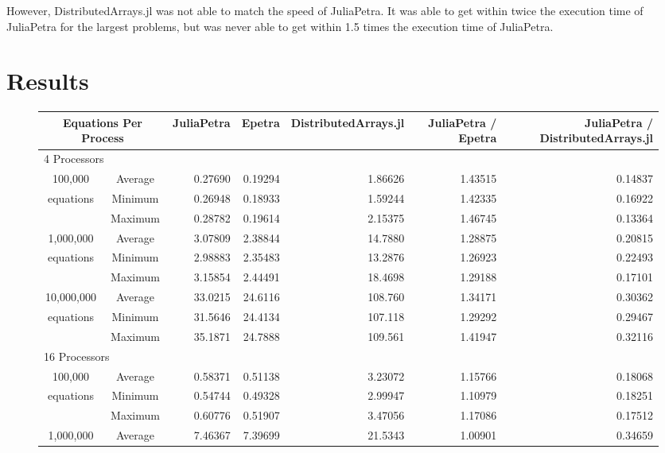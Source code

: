 \documentclass[acmsmall]{acmart}
\begin{document}
However, DistributedArrays.jl was not able to match the speed of JuliaPetra.
It was able to get within twice the execution time of JuliaPetra for the largest problems,
but was never able to get within 1.5 times the execution time of JuliaPetra.

\section{Results}

\begin{figure}
\begin{tabular}{|c c|r|r|r||r|r|}
	\hline
		\multicolumn{2}{|c|}{Equations Per Process}
		& JuliaPetra
		& Epetra
		& \multicolumn{1}{m{1.8cm}||}{Distributed\-Arrays.jl}
		& \multicolumn{1}{m{1.75cm}|}{JuliaPetra / Epetra}
		& \multicolumn{1}{m{1.8cm}|}{JuliaPetra / Distributed\-Arrays.jl} \\
	\hline
		\multicolumn{7}{|l|}{4 Processors}\\
	\hline
		100,000			&Average & 0.27690 & 0.19294 & 1.86626 & 1.43515 & 0.14837 \\
		equations		&Minimum & 0.26948 & 0.18933 & 1.59244 & 1.42335 & 0.16922 \\
						&Maximum & 0.28782 & 0.19614 & 2.15375 & 1.46745 & 0.13364 \\
	\hline
		1,000,000		&Average & 3.07809 & 2.38844 & 14.7880 & 1.28875 & 0.20815 \\
		equations		&Minimum & 2.98883 & 2.35483 & 13.2876 & 1.26923 & 0.22493 \\
						&Maximum & 3.15854 & 2.44491 & 18.4698 & 1.29188 & 0.17101 \\
	\hline
		10,000,000		&Average & 33.0215 & 24.6116 & 108.760 & 1.34171 & 0.30362 \\
		equations		&Minimum & 31.5646 & 24.4134 & 107.118 & 1.29292 & 0.29467 \\
						&Maximum & 35.1871 & 24.7888 & 109.561 & 1.41947 & 0.32116 \\
	\hline
		\multicolumn{7}{|l|}{16 Processors}\\
	\hline
		100,000			&Average & 0.58371 & 0.51138 & 3.23072 & 1.15766 & 0.18068 \\
		equations		&Minimum & 0.54744 & 0.49328 & 2.99947 & 1.10979 & 0.18251 \\
						&Maximum & 0.60776 & 0.51907 & 3.47056 & 1.17086 & 0.17512 \\
	\hline
		1,000,000		&Average & 7.46367 & 7.39699 & 21.5343 & 1.00901 & 0.34659 \\

\end{tabular}
\end{figure}
\end{document}
